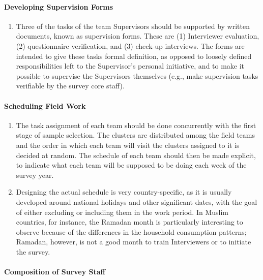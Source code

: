 \documentclass[
]{article}
\providecommand{\tightlist}{%
  \setlength{\itemsep}{0pt}\setlength{\parskip}{0pt}}
\begin{document}
\hypertarget{developing-supervision-forms}{%
\paragraph{Developing Supervision Forms}\label{developing-supervision-forms}}

\begin{enumerate}
\def\labelenumi{\arabic{enumi}.}
\setcounter{enumi}{360}
\tightlist
\item
  Three of the tasks of the team Supervisors should be supported by
  written documents, known as supervision forms. These are (1)
  Interviewer evaluation, (2) questionnaire verification, and (3)
  check-up interviews. The forms are intended to give these tasks
  formal definition, as opposed to loosely defined responsibilities
  left to the Supervisor's personal initiative, and to make it
  possible to supervise the Supervisors themselves (e.g., make
  supervision tasks verifiable by the survey core staff).
\end{enumerate}

\hypertarget{scheduling-field-work}{%
\paragraph{Scheduling Field Work}\label{scheduling-field-work}}

\begin{enumerate}
\def\labelenumi{\arabic{enumi}.}
\setcounter{enumi}{361}
\item
  The task assignment of each team should be done concurrently with
  the first stage of sample selection. The clusters are distributed
  among the field teams and the order in which each team will visit
  the clusters assigned to it is decided at random. The schedule of
  each team should then be made explicit, to indicate what each team
  will be supposed to be doing each week of the survey year.
\item
  Designing the actual schedule is very country-specific, as it is
  usually developed around national holidays and other significant
  dates, with the goal of either excluding or including them in the
  work period. In Muslim countries, for instance, the Ramadan month is
  particularly interesting to observe because of the differences in
  the household consumption patterns; Ramadan, however, is not a good
  month to train Interviewers or to initiate the survey.
\end{enumerate}

\hypertarget{composition-of-survey-staff}{%
\paragraph{Composition of Survey Staff}\label{composition-of-survey-staff}}
\end{document}
